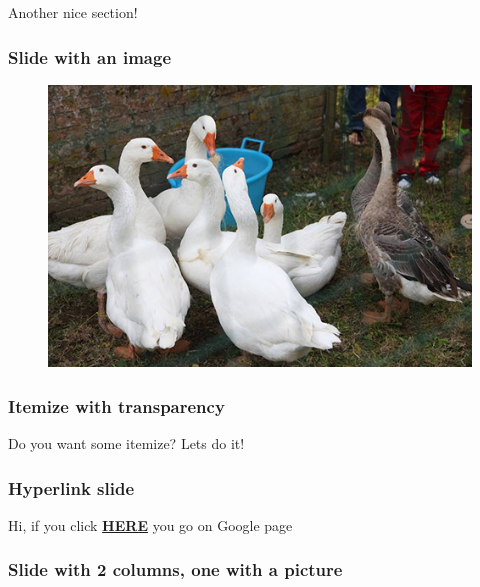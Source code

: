 \documentclass[xcolor=dvipsnames,aspectratio=169]{beamer}
\begin{document}
{\begin{section}{Another nice section!}
\begin{frame}[t]
\frametitle{Slide with an image} 
\begin{figure}
  \centering
  \includegraphics[scale=0.22]{Immagini/duck.jpg}
\end{figure}
\end{frame}

\begin{frame}[t]
\frametitle{Itemize with transparency}
Do you want some itemize? Lets do it!
\begin{itemize}
\end{itemize}
\end{frame}

\end{section}

\begin{frame}[t]
\frametitle{Hyperlink slide} 
Hi, if you click \textbf{\href{https://www.google.com}{HERE}} you go on Google page 
\end{frame}

\begin{frame}
\frametitle{Slide with 2 columns, one with a picture}

\begin{columns}


\end{columns}
\end{frame}}
\end{document}
